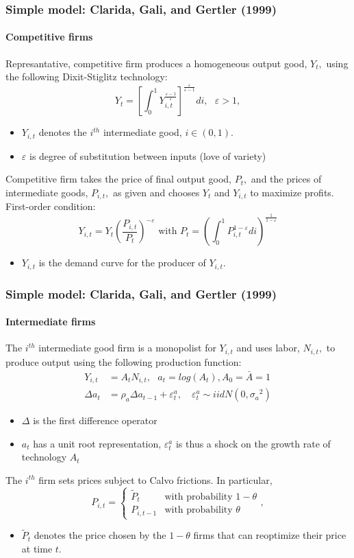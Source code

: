 \documentclass[handout]{beamer}  %
\begin{document}
\begin{frame}    \frametitle{Simple model: Clarida, Gali, and Gertler (1999)}\framesubtitle{Competitive firms}
Represantative, competitive firm produces a homogeneous output good, $Y_{t},$ using the following Dixit-Stiglitz technology:
\[
Y_{t}=\left[ \int_{0}^{1}Y_{i,t}^{\frac{\varepsilon-1}{\varepsilon}}\right]
^\frac{\varepsilon}{\varepsilon-1}di,\text{ }\varepsilon >1,
\]%
\begin{itemize}
\item $Y_{i,t}$ denotes the $i^{th}$ intermediate good, $i\in \left(0,1\right).$
\item $\varepsilon$ is degree of substitution between inputs (love of variety)
\end{itemize}
Competitive firm takes the price of final output good, $P_{t},$ and the prices of intermediate goods, $P_{i,t},$ as given and chooses $Y_t$ and $Y_{i,t}$ to maximize profits. First-order condition:
\[
Y_{i,t}=Y_{t}\left( \frac{P_{i,t}}{P_{t}}\right) ^{-\varepsilon} \text{ with } P_t = \left(\int_0^1 P_{i,t}^{1-\varepsilon}di\right)^\frac{1}{1-\varepsilon}
\]%
\begin{itemize}
  \item $Y_{i,t}$ is the demand curve for the producer of $Y_{i,t}$.
\end{itemize}
\end{frame}

\begin{frame}    \frametitle{Simple model: Clarida, Gali, and Gertler (1999)}\framesubtitle{Intermediate firms}
The $i^{th}$ intermediate good firm is a monopolist for $Y_{i,t}$ and uses labor, $N_{i,t},$
to produce output using the following production function:%
\begin{align}
Y_{i,t}&=A_t N_{i,t},\text{ }a_t = log(A_t), A_0=\bar{A}=1\nonumber\\
\Delta a_{t}&=\rho_a \Delta a_{t-1}+\varepsilon _{t}^{a}, \quad \varepsilon_t^a \sim iidN(0,{\sigma_a}^2)
\end{align}
\begin{itemize}
  \item $\Delta $ is the first difference operator
  \item $a_{t}$ has a unit root representation, $\varepsilon_t^a$ is thus a shock on the growth rate of technology $A_t$
\end{itemize}
The $i^{th}$ firm sets prices subject to Calvo frictions. In particular,%
\[
P_{i,t}=\left\{
\begin{array}{cc}
\tilde{P}_{t} & \text{with probability }1-\theta \\
P_{i,t-1} & \text{with probability }\theta%
\end{array}%
\right. ,
\]%
\begin{itemize}
  \item $\tilde{P}_{t}$ denotes the price chosen by the $1-\theta $ firms that can reoptimize their price at time $t.$
\end{itemize}
\end{frame}
\end{document}
